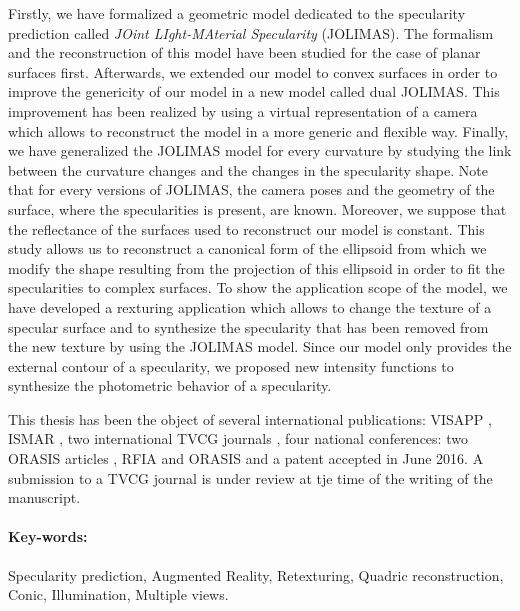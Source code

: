 Firstly, we have formalized a geometric model dedicated to the specularity prediction called \textit{JOint LIght-MAterial Specularity} (JOLIMAS). The formalism and the reconstruction of this model have been studied for the case of planar surfaces first. Afterwards, we extended our model to convex surfaces in order to improve the genericity of our model in a new model called dual JOLIMAS. This improvement has been realized by using a virtual representation of a camera which allows to reconstruct the model in a more generic and flexible way. Finally, we have generalized the \mbox{JOLIMAS} model for every curvature by studying the link between the curvature changes and the changes in the specularity shape. Note that for every versions of JOLIMAS, the camera poses and the geometry of the surface, where the specularities is present, are known. Moreover, we suppose that the reflectance of the surfaces used to reconstruct our model is constant. This study allows us to reconstruct a canonical form of the ellipsoid from which we modify the shape resulting from the projection of this ellipsoid in order to fit the specularities to complex surfaces. To show the application scope of the model, we have developed a rexturing application which allows to change the texture of a specular surface and to synthesize the specularity that has been removed from the new texture by using the JOLIMAS model. Since our model only provides the external contour of a specularity, we proposed new intensity functions to synthesize the photometric behavior of a specularity.

This thesis has been the object of several international publications: VISAPP \citeyearpar{morgand2014generic}, ISMAR \citeyearpar{morgand2016empirical, morgand2017multipleview}, two international TVCG journals \citeyearpar{morgand2017amultiple, morgand2017multiple}, four national conferences: two ORASIS articles \citeyearpar{morgand2015reconstruction, morgand2015detection}, RFIA \citeyearpar{morgand2015modele} and ORASIS \citeyearpar{morgand2017modele} and a patent accepted in June 2016. A submission to a TVCG journal is under review at tje time of the writing of the manuscript.

\paragraph{Key-words:} Specularity prediction, Augmented Reality, Retexturing, Quadric reconstruction, Conic, Illumination, Multiple views.

